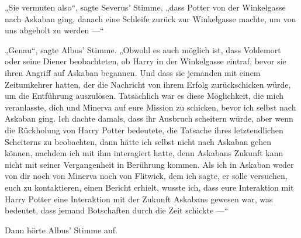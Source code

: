 „Sie vermuten also“, sagte Severus’ Stimme, „dass Potter von der Winkelgasse nach Askaban ging, danach eine Schleife zurück zur Winkelgasse machte, um von uns abgeholt zu werden —“

„Genau“, sagte Albus’ Stimme.
„Obwohl es auch möglich ist, dass Voldemort oder seine Diener beobachteten, ob Harry in der Winkelgasse eintraf, bevor sie ihren Angriff auf Askaban begannen. Und dass sie jemanden mit einem Zeitumkehrer hatten, der die Nachricht von ihrem Erfolg zurückschicken würde, um die Entführung auszulösen. Tatsächlich war es diese Möglichkeit, die mich veranlasste, dich und Minerva auf eure Mission zu schicken, bevor ich selbst nach Askaban ging. Ich dachte damals, dass ihr Ausbruch scheitern würde, aber wenn die Rückholung von Harry Potter bedeutete, die Tatsache ihres letztendlichen Scheiterns zu beobachten, dann hätte ich selbst nicht nach Askaban gehen können, nachdem ich mit ihm interagiert hatte, denn Askabans Zukunft kann nicht mit seiner Vergangenheit in Berührung kommen. Als ich in Askaban weder von dir noch von Minerva noch von Flitwick, dem ich sagte, er solle versuchen, euch zu kontaktieren, einen Bericht erhielt, wusste ich, dass eure Interaktion mit Harry Potter eine Interaktion mit der Zukunft Askabans gewesen war, was bedeutet, dass jemand Botschaften durch die Zeit schickte —“

Dann hörte Albus’ Stimme auf.

